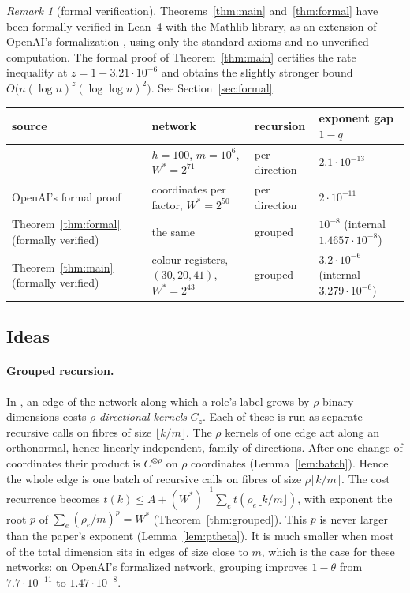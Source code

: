 \documentclass[11pt]{article}
\theoremstyle{definition}
\theoremstyle{remark}
\newtheorem{remark}[theorem]{Remark}
\begin{document}
\begin{remark}[formal verification]\label{rem:status}
Theorems~\ref{thm:main} and~\ref{thm:formal} have been formally verified in Lean~4 with the Mathlib
library, as an extension of OpenAI's formalization \cite{oailean}, using only the standard axioms and
no unverified computation. The formal proof of Theorem~\ref{thm:main} certifies the rate inequality
at $z=1-3.21\cdot10^{-6}$ and obtains the slightly stronger bound
$O\big(n(\log n)^z(\log\log n)^2\big)$. See Section~\ref{sec:formal}.
\end{remark}

\begin{center}\small
\begin{tabular}{@{}>{\raggedright\arraybackslash}p{4.0cm}>{\raggedright\arraybackslash}p{4.4cm}>{\raggedright\arraybackslash}p{2.1cm}>{\raggedright\arraybackslash}p{3.6cm}@{}}
\toprule
source & network & recursion & exponent gap $1-q$\\
\midrule
\cite[Thm.~1.1]{oai} & $h=100$, $m=10^6$, $W^*=2^{71}$ & per direction & $2.1\cdot10^{-13}$\\
OpenAI's formal proof \cite{oailean} & 32 coordinates per factor, $W^*=2^{50}$ & per direction & $2\cdot10^{-11}$\\
Theorem~\ref{thm:formal} (formally verified) & the same & grouped & $10^{-8}$ (internal $1.4657\cdot10^{-8}$)\\
Theorem~\ref{thm:main} (formally verified) & colour registers, $(30,20,41)$, $W^*=2^{43}$ & grouped & $3.2\cdot10^{-6}$ (internal $3.279\cdot10^{-6}$)\\
\bottomrule
\end{tabular}
\end{center}

\subsection{Ideas}
\paragraph{Grouped recursion.} In \cite{oai}, an edge of the network along which a role's label grows
by $\rho$ binary dimensions costs $\rho$ \emph{directional kernels} $C_z$. Each of these is run as
separate recursive calls on fibres of size $\lfloor k/m\rfloor$. The $\rho$ kernels of one edge act
along an orthonormal, hence linearly independent, family of directions. After one change of
coordinates their product is $C^{\otimes\rho}$ on $\rho$ coordinates (Lemma~\ref{lem:batch}). Hence the
whole edge is one batch of recursive calls on fibres of size $\rho\lfloor k/m\rfloor$. The cost
recurrence becomes $t(k)\le A+(W^*)^{-1}\sum_et(\rho_e\lfloor k/m\rfloor)$, with exponent the root $p$ of
$\sum_e(\rho_e/m)^p=W^*$ (Theorem~\ref{thm:grouped}). This $p$ is never larger than the paper's
exponent (Lemma~\ref{lem:ptheta}). It is much smaller when most of the total dimension sits in edges of
size close to $m$, which is the case for these networks: on OpenAI's formalized network, grouping
improves $1-\theta$ from $7.7\cdot10^{-11}$ to $1.47\cdot10^{-8}$.
\end{document}

